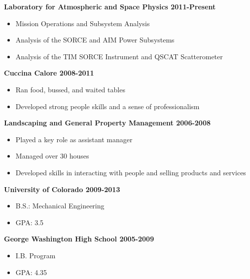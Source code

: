 \documentclass[11pt]{article}
\begin{document}
\bigskip

 \medskip
\noindent \centerline{\large \bf Laboratory for Atmospheric and Space Physics \hfill 2011-Present}
\begin{itemize}
    \item Mission Operations and Subsystem Analysis
    \item Analysis of the SORCE and AIM Power Subsystems
    \item Analysis of the TIM SORCE Instrument and QSCAT Scatterometer
\end{itemize}
\bigskip
\noindent \centerline{\large \bf Cuccina Calore \hfill 2008-2011}
\begin{itemize}
    \item Ran food, bussed, and waited tables
    \item Developed strong people skills and a sense of professionalism
\end{itemize}
\bigskip
\noindent \centerline{\large \bf Landscaping and General Property Management \hfill 2006-2008}
\begin{itemize}
    \item Played a key role as assistant manager
    \item Managed over 30 houses
    \item Developed skills in interacting with people and selling products and services
\end{itemize}
\bigskip
{} \medskip
\noindent \centerline{\large \bf University of Colorado \hfill 2009-2013}
\begin{itemize}
    \item B.S.: Mechanical Engineering
    \item GPA: 3.5
\end{itemize}
\noindent \centerline{\large \bf George Washington High School \hfill 2005-2009}
\begin{itemize}
    \item I.B. Program
    \item GPA: 4.35
\end{itemize}
\end{document}
